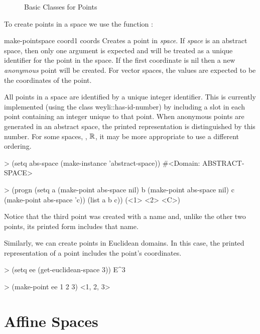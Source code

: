 \begin{figure}
\begin{center}
\end{center}
\caption{Basic Classes for Points\label{PointClasses:Fig}}
\end{figure}

To create points in a space we use the function :
  
\begin{functiondef}{make-point}{space coord1 \rest coords}
Creates a point in {\em space}. If {\em space} is an abstract space,
then only one argument is expected and will be treated as a unique
identifier for the point in the space. If the first coordinate is nil
then a new {\em anonymous} point will be created. For vector spaces,
the values are expected to be the coordinates of the point.
\end{functiondef}
   
All points in a space are identified by a unique integer
identifier. This is currently implemented (using the class {\sf
weyli::has-id-number}) by including a slot in each point containing an
integer unique to that point.  When anonymous points are generated in
an abstract space, the printed representation is distinguished by this
number. For some spaces, \eg, ${\Bbb R}$, it may be more appropriate to use
a different ordering.

\begin{code}  
> (setq abs-space (make-instance 'abstract-space))
#<Domain: ABSTRACT-SPACE>

> (progn
     (setq a (make-point abs-space nil)
           b (make-point abs-space nil)
           c (make-point abs-space 'c))
     (list a b c))
(<1> <2> <C>)
\end{code}
  
\noindent
Notice that the third point was created with a name and, unlike the
other two points, its printed form includes that name.
  
Similarly, we can create points in Euclidean domains.  In this case,
the printed representation of a point includes the point's
coordinates.
  
\begin{code}
> (setq ee (get-euclidean-space 3))
E^3
  
> (make-point ee 1 2 3)
<1, 2, 3>
\end{code}  
  
\section{Affine Spaces}
\label{AffineSpace:Sec}
  
